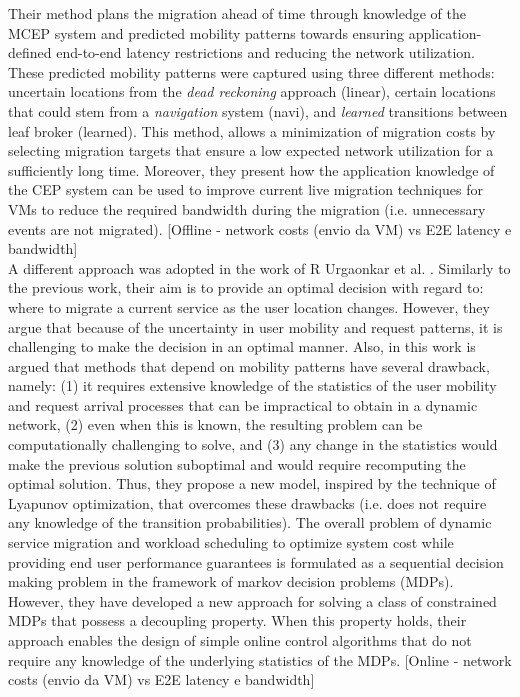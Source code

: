   Their method plans the migration ahead of time through knowledge of the MCEP system and predicted mobility patterns towards ensuring application-defined end-to-end latency restrictions and reducing the network utilization. These predicted mobility patterns were captured using three different methods: uncertain locations from the \textit{dead reckoning} approach (linear), certain locations that could stem from a \textit{navigation} system (navi), and \textit{learned} transitions between leaf broker (learned). This method, allows a minimization of migration costs by selecting migration targets that ensure a low expected network utilization for a sufficiently long time. Moreover, they present how the application knowledge of the CEP system can be used to improve current live migration techniques for VMs to reduce the required bandwidth during the migration (i.e. unnecessary events are not migrated). [Offline - network costs (envio da VM) vs E2E latency e bandwidth]\\
\noindent\tab A different approach was adopted in the work of R Urgaonkar et al. \cite{urgaonkar2015dynamic}. Similarly to the previous work, their aim is to provide an optimal decision with regard to: where to migrate a current service as the user location changes. However, they argue that because of the uncertainty in user mobility and request patterns, it is challenging to make the decision in an optimal manner. Also, in this work is argued that methods that depend on mobility patterns have several drawback, namely: (1) it requires extensive knowledge of the statistics of the user mobility and request arrival processes that can be impractical to obtain in a dynamic network, (2) even when this is known, the resulting problem can be computationally challenging to solve, and (3) any change in the statistics would make the previous solution suboptimal and would require recomputing the optimal solution. Thus, they propose a new model, inspired by the technique of Lyapunov optimization, that overcomes these drawbacks (i.e. does not require any knowledge of the transition probabilities). The overall problem of dynamic service migration and workload scheduling to optimize system cost while providing end user performance guarantees is formulated as a sequential decision making problem in the framework of markov decision problems (MDPs). However, they have developed a new approach for solving a class of constrained MDPs that possess a decoupling property. When this property holds, their approach enables the design of simple online control algorithms that do not require any knowledge of the underlying statistics of the MDPs. [Online - network costs (envio da VM) vs E2E latency e bandwidth]\\
